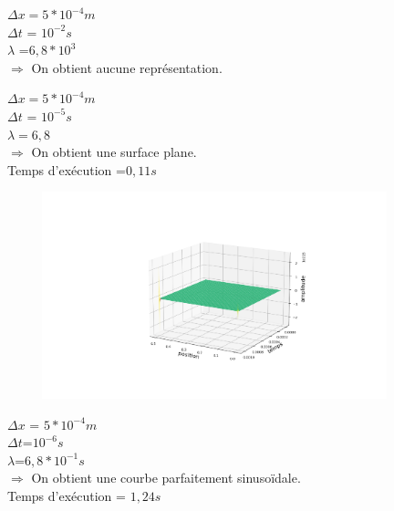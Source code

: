 \begin{enumerate}[label=\alph*)]
\begin{minipage}{.5\textwidth}%

\item $\Delta x =  5*{10}^{-4}m$\\
$\Delta t$ = ${10}^{-2} s $\\
$\lambda$ =$6,8*{10}^{3}$\\

$\Longrightarrow$ On obtient aucune représentation.

\end{minipage}


\begin{minipage}{.5\textwidth}%

\item $\Delta x = 5*{10}^{-4}m$\\
$\Delta t$ = ${10}^{-5} s $ \\
$\lambda =6,8$\\

$\Longrightarrow$ On obtient une surface plane.\\
Temps d'exécution =$0,11s$


\end{minipage}%
\hfill
\begin{minipage}{.45\textwidth}%
\includegraphics[width=12cm,height=6cm]{explicited.png}

\end{minipage}%

\begin{minipage}{.5\textwidth}%

\item $\Delta x$ = $5*{10}^{-4}m$\\
$\Delta t$=${10}^{-6} s $ \\
$\lambda$=$6,8*{10}^{-1}s$\\

$\Longrightarrow$ On obtient une courbe parfaitement sinusoïdale.\\
Temps d'exécution = $1,24s$


\end{minipage}
\end{enumerate}
